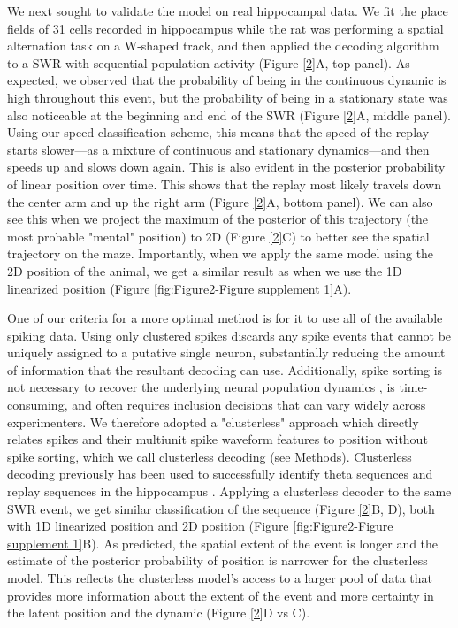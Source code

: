 \documentclass[times, twoside]{zHenriquesLab-StyleBioRxiv}
\begin{document}
We next sought to validate the model on real hippocampal data. We fit the place fields of 31 cells recorded in hippocampus while the rat was performing a spatial alternation task on a W-shaped track, and then applied the decoding algorithm to a SWR with sequential population activity (Figure \ref{2}A, top panel). As expected, we observed that the probability of being in the continuous dynamic is high throughout this event, but the probability of being in a stationary state was also noticeable at the beginning and end of the SWR (Figure \ref{2}A, middle panel). Using our speed classification scheme, this means that the speed of the replay starts slower---as a mixture of continuous and stationary dynamics---and then speeds up and slows down again. This is also evident in the posterior probability of linear position over time. This shows that the replay most likely travels down the center arm and up the right arm (Figure \ref{2}A, bottom panel). We can also see this when we project the maximum of the posterior of this trajectory (the most probable "mental" position) to 2D (Figure \ref{2}C) to better see the spatial trajectory on the maze. Importantly, when we apply the same model using the 2D position of the animal, we get a similar result as when we use the 1D linearized position (Figure \ref{fig:Figure2-Figure supplement 1}A).

One of our criteria for a more optimal method is for it to use all of the available spiking data. Using only clustered spikes discards any spike events that cannot be uniquely assigned to a putative single neuron, substantially reducing the amount of information that the resultant decoding can use. Additionally, spike sorting is not necessary to recover the underlying neural population dynamics \cite{TrautmannAccurateEstimationNeural2019}, is time-consuming, and often requires inclusion decisions that can vary widely across experimenters. We therefore adopted a "clusterless" approach which directly relates spikes and their multiunit spike waveform features to position without spike sorting, which we call clusterless decoding (see Methods). Clusterless decoding previously has been used to successfully identify theta sequences and replay sequences in the hippocampus \cite{KloostermanBayesiandecodingusing2014, ChenTransductiveneuraldecoding2012,DengRapidclassificationhippocampal2016, KayConstantSubsecondCycling2020}. Applying a clusterless decoder to the same SWR event, we get similar classification of the sequence (Figure \ref{2}B, D), both with 1D linearized position and 2D position (Figure \ref{fig:Figure2-Figure supplement 1}B). As predicted, the spatial extent of the event is longer and the estimate of the posterior probability of position is narrower for the clusterless model. This reflects the clusterless model's access to a larger pool of data that provides more information about the extent of the event and more certainty in the latent position and the dynamic (Figure \ref{2}D vs C).
\end{document}
